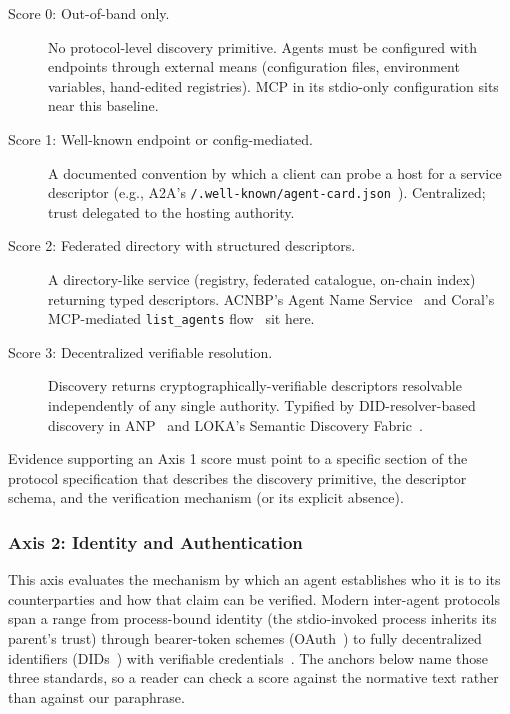 \begin{description}
  \item[Score 0: Out-of-band only.] No protocol-level
    discovery primitive. Agents must be configured with
    endpoints through external means (configuration files,
    environment variables, hand-edited registries). MCP in
    its stdio-only configuration sits near this baseline.
  \item[Score 1: Well-known endpoint or
    config-mediated.] A documented convention by which a
    client can probe a host for a service descriptor
    (e.g., A2A's \texttt{/.well-known/agent-card.json}~\cite{spec_a2a}).
    Centralized; trust delegated to the hosting authority.
  \item[Score 2: Federated directory with structured
    descriptors.] A directory-like service (registry,
    federated catalogue, on-chain index) returning typed
    descriptors. ACNBP's Agent Name Service~\cite{spec_acnbp}
    and Coral's MCP-mediated \texttt{list\_agents} flow~\cite{spec_coral}
    sit here.
  \item[Score 3: Decentralized verifiable resolution.]
    Discovery returns cryptographically-verifiable
    descriptors resolvable independently of any single
    authority. Typified by DID-resolver-based discovery in
    ANP~\cite{spec_anp} and LOKA's Semantic Discovery
    Fabric~\cite{spec_loka}.
\end{description}

Evidence supporting an Axis 1 score must point to a specific
section of the protocol specification that describes the
discovery primitive, the descriptor schema, and the
verification mechanism (or its explicit absence).

\subsubsection{Axis 2: Identity and Authentication}
\label{sec:rubric:axis2}

This axis evaluates the mechanism by which an agent
establishes who it is to its counterparties and how that
claim can be verified. Modern inter-agent protocols span a
range from process-bound identity (the stdio-invoked
process inherits its parent's trust) through bearer-token
schemes (OAuth~\cite{rfc6749}) to fully decentralized
identifiers (DIDs~\cite{w3c_did_core}) with verifiable
credentials~\cite{w3c_vc_data_model}. The anchors below name
those three standards, so a reader can check a score against
the normative text rather than against our paraphrase.

